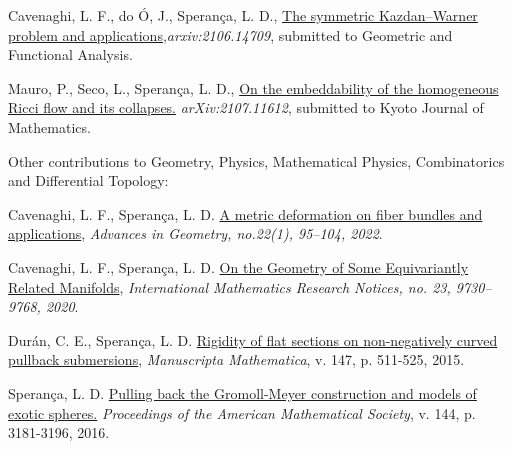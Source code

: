 \documentclass[10pt]{article}
\newenvironment{innerlist}[1][\enskip\textbullet]%
{\begin{compactitem}[#1]}{\end{compactitem}}
\begin{document}
\begin{enumerate}
\begin{innerlist}[-]
		
		
		\item Cavenaghi, L. F., do Ó, J., Sperança, L. D., \href{https://arxiv.org/abs/2106.14709}{The symmetric Kazdan--Warner problem and applications},\textit{{arxiv:2106.14709}}, submitted to Geometric and Functional Analysis.
		
		
		
		
		\item  Mauro, P., Seco, L., Sperança, L. D., \href{https://arxiv.org/abs/2107.11612}{On the embeddability of the homogeneous Ricci flow and its collapses.} \textit{{arXiv:2107.11612}}, submitted to  Kyoto Journal of Mathematics.
		
		
		
		\end{innerlist}
		
		
		\item 
		Other contributions to Geometry, Physics, Mathematical Physics, Combinatorics and Differential Topology:
		
		
		\begin{innerlist}[-]
					\item Cavenaghi, L. F., Sperança, L. D. \href{https://doi.org/10.1515/advgeom-2021-0007}{A metric deformation on fiber bundles and applications},  \textit{Advances in Geometry, no.22(1), 95--104, 2022}.
			
			
			\item Cavenaghi, L. F., Sperança, L. D. \href{https://academic.oup.com/imrn/advance-article-abstract/doi/10.1093/imrn/rny268/5194089}{On the Geometry of Some Equivariantly Related Manifolds},  	\textit{ {International Mathematics Research Notices, no. 23, 9730–9768, 2020}}.
			
			
			
			\item Durán, C. E., Sperança, L. D. \href{https://link.springer.com/article/10.1007/s00229-015-0731-0}{Rigidity of flat sections on non-negatively curved pullback submersions}, {\textit{Manuscripta Mathematica}, v. 147, p. 511-525, 2015}.

			
			
			
			
			
	
		
		
		
		
		
		\item Sperança, L. D. \href{https://www.ams.org/journals/proc/2016-144-07/S0002-9939-2015-12945-0/home.html}{Pulling back the Gromoll-Meyer construction and models of exotic spheres.} {\textit{Proceedings of the American Mathematical Society}, v. 144, p. 3181-3196, 2016}.
		

\end{innerlist}
\end{enumerate}
\end{document}
